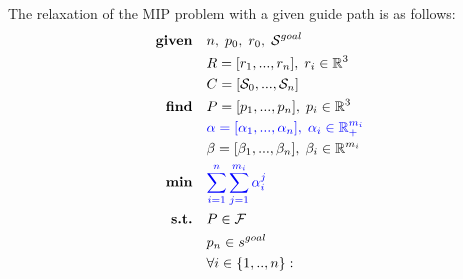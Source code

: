 The relaxation of the MIP problem with a given guide path is as follows:
\begin{align}
    \textrm{\textbf{given}} %
                            \quad & n, \; p_0, \; r_0, \; \mathcal{S}^{goal} \nonumber\\
                            \quad & R=[r_1,...,r_n], \; r_i \in \mathbb{R}^{3} \nonumber\\
                            \quad & C=[\mathcal{S}_0, ..., \mathcal{S}_n] \nonumber\\
    \textrm{\textbf{find}}  \quad & P=[p_1,...,p_n], \; p_i \in \mathbb{R}^{3} \nonumber\\
                            \quad & \textcolor{blue}{\alpha=[\alpha_1,...,\alpha_n], \; \alpha_i \in \mathbb{R}_{+}^{m_i}} \label{eq:mbc:sl1m:slack_relaxed}\\
                            \quad & \beta=[\beta_1,...,\beta_n], \; \beta_i \in \mathbb{R}^{m_i} \nonumber\\
    \textrm{\textbf{min}}  \quad & \textcolor{blue}{\sum_{i=1}^{n} \sum_{j=1}^{m_i} \alpha_i^j} \label{eq:mbc:sl1m:norm_l1}\\
    \textrm{\textbf{s.t.}}  \quad & P \in \mathcal{F} \nonumber\\
                            \quad & p_n \in s^{goal} \nonumber\\
                            \quad & \forall i \in \{1,..,n\} : \nonumber\\

\end{align}
